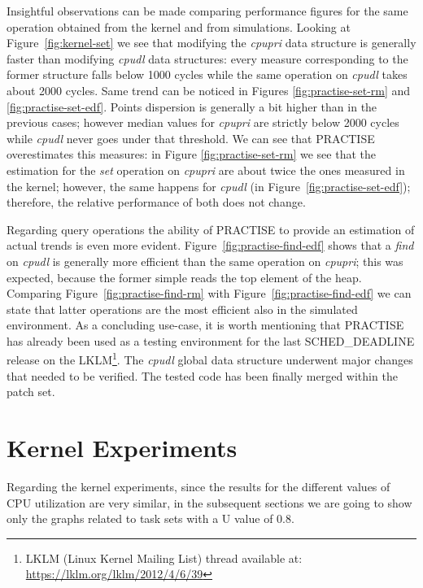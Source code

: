 Insightful observations can be made comparing performance figures for the same operation
obtained from the kernel and from simulations. Looking at Figure~\ref{fig:kernel-set} we
see that modifying the \emph{cpupri} data structure is generally faster than modifying
\emph{cpudl} data structures: every measure corresponding to the former structure falls
below 1000 cycles while the same operation on \emph{cpudl} takes about 2000 cycles. Same
trend can be noticed in Figures \ref{fig:practise-set-rm} and \ref{fig:practise-set-edf}.
Points dispersion is generally a bit higher than in the previous cases; however median
values for \emph{cpupri} are strictly below 2000 cycles while \emph{cpudl} never goes
under that threshold. We can see that PRACTISE overestimates this measures: in Figure
\ref{fig:practise-set-rm} we see that the estimation for the \emph{set} operation on
\emph{cpupri} are about twice the ones measured in the kernel; however, the same happens
for \emph{cpudl} (in Figure~\ref{fig:practise-set-edf}); therefore, the relative
performance of both does not change.

Regarding query operations the ability of PRACTISE to provide an estimation of actual
trends is even more evident. Figure~\ref{fig:practise-find-edf} shows that a \emph{find} 
on \emph{cpudl} is generally more efficient than the same operation on \emph{cpupri}; this
was expected, because the former simple reads the top element of the heap. Comparing
Figure~\ref{fig:practise-find-rm} with Figure~\ref{fig:practise-find-edf} we can state 
that latter operations are the most efficient also in the simulated environment.
As a concluding use-case, it is worth mentioning that PRACTISE has already been used as a
testing environment for the last SCHED\_DEADLINE release on the LKLM\footnote{LKLM 
(Linux Kernel Mailing List) thread available at: \url{https://lklm.org/lklm/2012/4/6/39}}.
The \emph{cpudl} global data structure underwent major changes that needed to be verified.
The tested code has been finally merged within the patch set.

\section{Kernel Experiments\label{sec:exp_setup}}

Regarding the kernel experiments, since the results for the different values 
of CPU utilization are very similar, in the subsequent sections we are 
going to show only the graphs related to task sets with a U value of 0.8.

